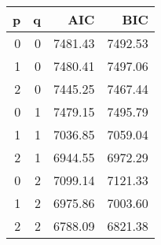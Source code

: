 \begin{table}[ht]
\centering
\begin{tabular}{rrrr}
  \hline
p & q & AIC & BIC \\ 
  \hline
  0 &   0 & 7481.43 & 7492.53 \\ 
    1 &   0 & 7480.41 & 7497.06 \\ 
    2 &   0 & 7445.25 & 7467.44 \\ 
    0 &   1 & 7479.15 & 7495.79 \\ 
    1 &   1 & 7036.85 & 7059.04 \\ 
    2 &   1 & 6944.55 & 6972.29 \\ 
    0 &   2 & 7099.14 & 7121.33 \\ 
    1 &   2 & 6975.86 & 7003.60 \\ 
    2 &   2 & 6788.09 & 6821.38 \\ 
   \hline
\end{tabular}
\end{table}
